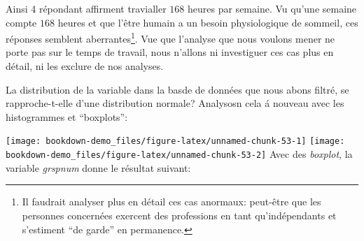 \documentclass[
]{book}
\newenvironment{Shaded}{\begin{snugshade}}{\end{snugshade}}
\newcommand{\AttributeTok}[1]{\textcolor[rgb]{0.77,0.63,0.00}{#1}}
\newcommand{\CommentTok}[1]{\textcolor[rgb]{0.56,0.35,0.01}{\textit{#1}}}
\newcommand{\DecValTok}[1]{\textcolor[rgb]{0.00,0.00,0.81}{#1}}
\newcommand{\FunctionTok}[1]{\textcolor[rgb]{0.00,0.00,0.00}{#1}}
\newcommand{\NormalTok}[1]{#1}
\newcommand{\SpecialCharTok}[1]{\textcolor[rgb]{0.00,0.00,0.00}{#1}}
\newcommand{\StringTok}[1]{\textcolor[rgb]{0.31,0.60,0.02}{#1}}
\begin{document}
Ainsi 4 répondant affirment travialler \(168\) heures par semaine. Vu qu'une semaine compte \(168\) heures et que l'être humain a un besoin physiologique de sommeil, ces réponses semblent aberrantes\footnote{Il faudrait analyser plus en détail ces cas anormaux: peut-être que les personnes concernées exercent des professions en tant qu'indépendants et s'estiment ``de garde'' en permanence.}. Vue que l'analyse que nous voulons mener ne porte pas sur le temps de travail, nous n'allons ni investiguer ces cas plus en détail, ni les exclure de nos analyses.

La distribution de la variable dans la basde de données que nous abons filtré, se rapproche-t-elle d'une distribution normale? Analysosn cela á nouveau avec les histogrammes et ``boxplots'':

\begin{Shaded}
\end{Shaded}

\texttt{[image: bookdown-demo\_files/figure-latex/unnamed-chunk-53-1]} \texttt{[image: bookdown-demo\_files/figure-latex/unnamed-chunk-53-2]}
Avec des \emph{boxplot}, la variable \emph{grspnum} donne le résultat suivant:
\end{document}

